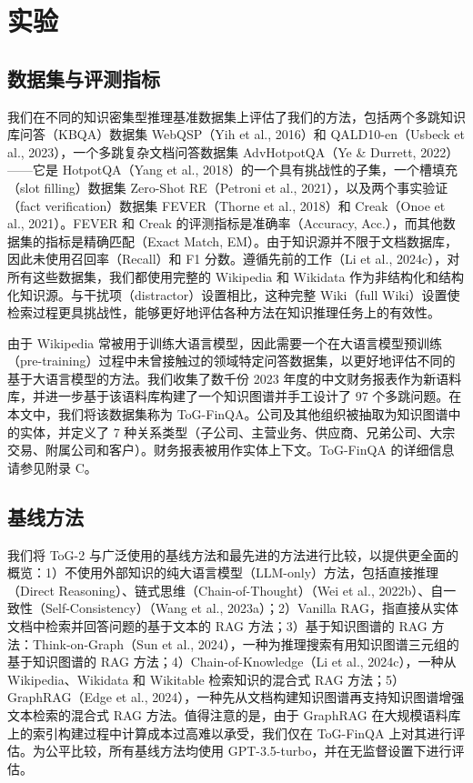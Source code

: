 \documentclass[11pt,UTF8,fontset=fandol]{ctexart}
\newcommand{\toctwo}{ToG-2}
\begin{document}
\section{实验}
\subsection{数据集与评测指标}

我们在不同的知识密集型推理基准数据集上评估了我们的方法，包括两个多跳知识库问答（KBQA）数据集 WebQSP（Yih et al., 2016）和 QALD10-en（Usbeck et al., 2023），一个多跳复杂文档问答数据集 AdvHotpotQA（Ye \& Durrett, 2022）——它是 HotpotQA（Yang et al., 2018）的一个具有挑战性的子集，一个槽填充（slot filling）数据集 Zero-Shot RE（Petroni et al., 2021），以及两个事实验证（fact verification）数据集 FEVER（Thorne et al., 2018）和 Creak（Onoe et al., 2021）。FEVER 和 Creak 的评测指标是准确率（Accuracy, Acc.），而其他数据集的指标是精确匹配（Exact Match, EM）。由于知识源并不限于文档数据库，因此未使用召回率（Recall）和 F1 分数。遵循先前的工作（Li et al., 2024c），对所有这些数据集，我们都使用完整的 Wikipedia 和 Wikidata 作为非结构化和结构化知识源。与干扰项（distractor）设置相比，这种完整 Wiki（full Wiki）设置使检索过程更具挑战性，能够更好地评估各种方法在知识推理任务上的有效性。

由于 Wikipedia 常被用于训练大语言模型，因此需要一个在大语言模型预训练（pre-training）过程中未曾接触过的领域特定问答数据集，以更好地评估不同的基于大语言模型的方法。我们收集了数千份 2023 年度的中文财务报表作为新语料库，并进一步基于该语料库构建了一个知识图谱并手工设计了 97 个多跳问题。在本文中，我们将该数据集称为 ToG-FinQA。公司及其他组织被抽取为知识图谱中的实体，并定义了 7 种关系类型（子公司、主营业务、供应商、兄弟公司、大宗交易、附属公司和客户）。财务报表被用作实体上下文。ToG-FinQA 的详细信息请参见附录 C。

\subsection{基线方法}

我们将 \toctwo{} 与广泛使用的基线方法和最先进的方法进行比较，以提供更全面的概览：1）不使用外部知识的纯大语言模型（LLM-only）方法，包括直接推理（Direct Reasoning）、链式思维（Chain-of-Thought）（Wei et al., 2022b）、自一致性（Self-Consistency）（Wang et al., 2023a）；2）Vanilla RAG，指直接从实体文档中检索并回答问题的基于文本的 RAG 方法；3）基于知识图谱的 RAG 方法：Think-on-Graph（Sun et al., 2024），一种为推理搜索有用知识图谱三元组的基于知识图谱的 RAG 方法；4）Chain-of-Knowledge（Li et al., 2024c），一种从 Wikipedia、Wikidata 和 Wikitable 检索知识的混合式 RAG 方法；5）GraphRAG（Edge et al., 2024），一种先从文档构建知识图谱再支持知识图谱增强文本检索的混合式 RAG 方法。值得注意的是，由于 GraphRAG 在大规模语料库上的索引构建过程中计算成本过高难以承受，我们仅在 ToG-FinQA 上对其进行评估。为公平比较，所有基线方法均使用 GPT-3.5-turbo，并在无监督设置下进行评估。
\end{document}
